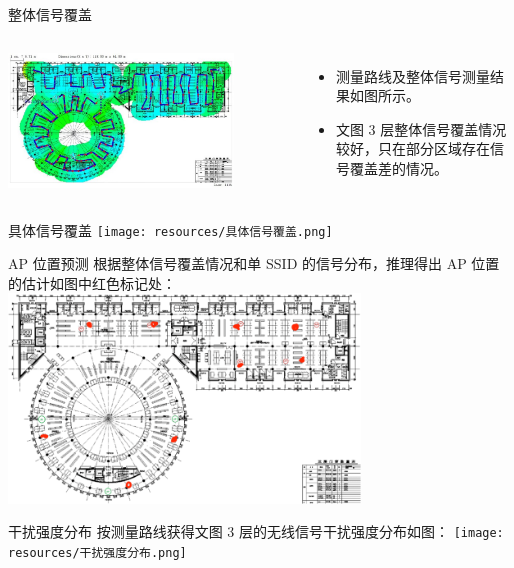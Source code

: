 \documentclass[aspectratio=169]{beamer}
\begin{document}
    \begin{frame}{整体信号覆盖}
      \begin{columns}[onlytextwidth]
        \includegraphics[width=0.8\textwidth]{resources/整体信号覆盖.png}
          \begin{itemize}
            \item 测量路线及整体信号测量结果如图所示。
            \item 文图 3 层整体信号覆盖情况较好，只在部分区域存在信号覆盖差的情况。
          \end{itemize}
      \end{columns}
    \end{frame}

    \begin{frame}{具体信号覆盖}
        \texttt{[image: resources/具体信号覆盖.png]}
    \end{frame}

    \begin{frame}{AP 位置预测}
      根据整体信号覆盖情况和单 SSID 的信号分布，推理得出 AP 位置的估计如图中红色标记处：
      \includegraphics[width=0.7\textwidth]{resources/AP 位置预测.png}
  \end{frame}

  \begin{frame}{干扰强度分布}
    按测量路线获得文图 3 层的无线信号干扰强度分布如图：
    \texttt{[image: resources/干扰强度分布.png]}
  \end{frame}
\end{document}
